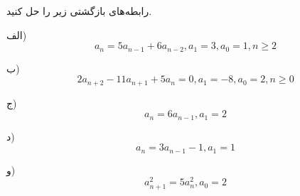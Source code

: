 \EXERCISE
رابطه‌های بازگشتی زیر را حل کنید.

الف)
$$a_n = 5a_{n-1} + 6a_{n-2}, a_1 = 3, a_0 = 1, n \geq 2$$

ب)
$$2a_{n+2} - 11a_{n+1} + 5a_n = 0, a_1 = -8, a_0 = 2, n \geq 0$$

ج)
$$a_n = 6a_{n-1} , a_1 = 2$$

د)
$$a_n = 3a_{n-1} - 1, a_1 = 1$$

و)
$$a_{n+1} ^2 = 5a_n^2, a_0 = 2$$